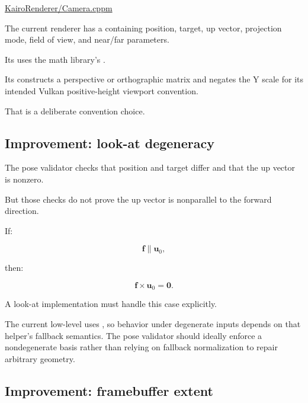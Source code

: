 \hypertarget{02-foundations-ii-ch037-kairorenderer-camera-and-viewport}{}

\href{https://github.com/swayam8624/KairoRenderer/blob/main/Camera.cppm?utm_source=chatgpt.com}{KairoRenderer/Camera.cppm}

The current renderer has a  containing position, target, up vector, projection mode, field of view, and near/far parameters.

Its  uses the math library's .

Its  constructs a perspective or orthographic matrix and negates the Y scale for its intended Vulkan positive-height viewport convention.

That is a deliberate convention choice.

\subsection{Improvement: look-at degeneracy}\label{02-foundations-ii-ch037-improvement-look-at-degeneracy}

\hypertarget{02-foundations-ii-ch037-improvement-look-at-degeneracy}{}

The pose validator checks that position and target differ and that the up vector is nonzero.

But those checks do not prove the up vector is nonparallel to the forward direction.

If:

\[
 \mathbf f\parallel\mathbf u_0,
\]

then:

\[
 \mathbf f\times\mathbf u_0=\mathbf0.
\]

A look-at implementation must handle this case explicitly.

The current low-level  uses , so behavior under degenerate inputs depends on that helper's fallback semantics. The pose validator should ideally enforce a nondegenerate basis rather than relying on fallback normalization to repair arbitrary geometry.

\subsection{Improvement: framebuffer extent}\label{02-foundations-ii-ch037-improvement-framebuffer-extent}

\hypertarget{02-foundations-ii-ch037-improvement-framebuffer-extent}{}

